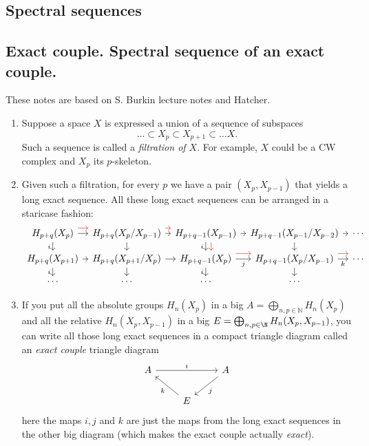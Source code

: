 \begin{definition}
\section{Spectral sequences}

\subsection{Exact couple. Spectral sequence of an exact couple.}

These notes are based on S. Burkin lecture notes and Hatcher.

\begin{enumerate}
	\item Suppose a space $X$ is expressed a union of a sequence of subspaces
		$$\ldots\subset X_p\subset X_{p+1}\subset \ldots X.$$
		Such a sequence is called a {\it filtration of $X$}. For example, $X$ could be a CW complex and $X_p$ its $p$-skeleton.

	\item Given such a filtration, for every $p$ we have a pair $(X_p,X_{p-1})$ that yields a long exact sequence. All these long exact sequences can be arranged in a staricase fashion:
$$\begin{tikzcd}[column sep=tiny,row sep=small]
	H_{p+q}(X_p)\arrow[r]\arrow[d,"i",swap]\arrow[r,red,shift={(0,0.2)}]&H_{p+q}(X_p/X_{p-1})\arrow[r]\arrow[r,red,shift={(0,0.2)}]\arrow[d]&H_{p+q-1}(X_{p-1})\arrow[r]\arrow[d,red,shift={(0.2,0)}]\arrow[d,"i",swap]&H_{p+q-1}(X_{p-1}/X_{p-2})\arrow[d]\arrow[r]&\cdots\\
	H_{p+q}(X_{p+1})\arrow[r]\arrow[d,"i",swap]&H_{p+q}(X_{p+1}/X_{p})\arrow[r]\arrow[d]&H_{p+q-1}(X_{p})\arrow[r,"j",swap]\arrow[r,red,shift={(0,0.2)}]\arrow[d,"i",swap]&H_{p+q-1}(X_{p}/X_{p-1})\arrow[r,red,shift={(0,0.2)}]\arrow[d]\arrow[r,"k",swap]&\cdots\\
	\cdots&\cdots&\cdots&\cdots
\end{tikzcd}$$
	\item If you put all the absolute groups $H_n(X_p)$ in a big $A=\bigoplus_{n,p\in \mathbb{N}}H_n(X_p)$ and all the relative $H_n(X_p,X_{p-1})$ in a big $E=\bigoplus_{n,p\in \N}H_n(X_p,X_{p-1})$, you can write all those long exact sequences in a compact triangle diagram called an {\it exact couple} triangle diagram
	$$
	\begin{tikzcd}
		A\arrow[rr,"i"]&&A\arrow[dl,"j"]\\
		&E\arrow[ul,"k"]
	\end{tikzcd}
$$
here the maps $i,j$ and $k$ are just the maps from the long exact sequences in the other big diagram (which makes the exact couple actually \textit{exact}).


\end{enumerate}
\end{definition}
